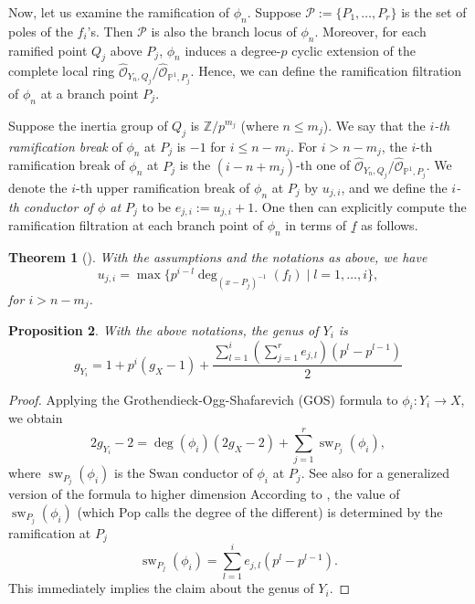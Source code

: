 \documentclass{compositio}
\newcommand{\mat}[1]{\todo[color=green]{MH: #1}}
\newtheorem{theorem}{Theorem}[section]
\newtheorem{proposition}[theorem]{Proposition}
\theoremstyle{remark}
\theoremstyle{remark}
\DeclareMathOperator{\sw}{sw}
\begin{document}
Now, let us examine the ramification of $\phi_n$. Suppose $\mathscr{P}:= \{P_1, \ldots, P_r\}$ is the set of poles of the $f_i$'s. Then $\mathscr{P}$ is also the branch locus of $\phi_n$. Moreover, for each ramified point $Q_j$ above $P_j$, $\phi_n$ induces a degree-$p$ cyclic extension of the complete local ring $\hat{\mathcal{O}}_{Y_n,Q_j}/\hat{\mathcal{O}}_{\mathbb{P}^1,P_j}$. Hence, we can define the ramification filtration of $\phi_n$ at a branch point $P_j$.

Suppose the inertia group of $Q_j$ is $\mathbb{Z}/p^{m_j}$ (where $n\le m_j$). We say that the \textit{$i$-th ramification break} of $\phi_n$ at $P_j$ is $-1$ for $i \le n-m_j$. For $i > n-m_j$, the $i$-th ramification break of $\phi_n$ at $P_j$ is the $(i-n+m_j)$-th one of $\hat{\mathcal{O}}_{Y_n,Q_j}/\hat{\mathcal{O}}_{\mathbb{P}^1,P_j}$. We denote the $i$-th upper ramification break of $\phi_n$ at $P_j$ by $u_{j,i}$, and we define the \textit{$i$-th conductor of $\phi$ at $P_j$} to be $e_{j,i}:=u_{j,i}+1$. One then can explicitly compute the ramification filtration at each branch point of $\phi_n$ in terms of $\underline{f}$ as follows.

\begin{theorem}[{\cite[Theorem 1]{MR1935414}}]
\label{theoremcaljumpirred}
With the assumptions and the notations as above, we have
\begin{equation}
\label{eqnformulalowerjumpasw}
    u_{j,i}=\max\{ p^{i-l} \deg_{(x-P_j)^{-1}} (f_{l}) \mid l=1, \ldots, i\}, 
\end{equation}
for $i>n-m_j$.
\end{theorem}

\begin{proposition}
With the above notations, the genus of $Y_i$ is
    \begin{equation}
    \label{eqngenera}
        g_{Y_i} = 1+ p^i(g_X-1)+ \frac{\sum_{l=1}^i (\sum_{j=1}^r e_{j,l})(p^l-p^{l-1})}{2}
    \end{equation}
\end{proposition}

\begin{proof}
Applying the Grothendieck-Ogg-Shafarevich (GOS) formula \cite[Exp. X formula 7.2]{MR0491704} to $\phi_i: Y_i \xrightarrow{} X$, we obtain
\begin{equation}
\label{eqnGOS}
2g_{Y_i}-2=\deg(\phi_i) (2g_X-2) + \sum_{j=1}^r \sw_{P_j}(\phi_i),
\end{equation}
where $\sw_{P_j}(\phi_i)$ is the Swan conductor of $\phi_i$ at $P_j$. See also \cite[Theorem 4.2.9]{MR2415398} for a generalized version of the formula to higher dimension 
According to \cite[Fact 2.3]{MR3194816}, the value of $\sw_{P_j}(\phi_i)$ (which Pop calls the degree of the different) is determined by the ramification at $P_j$
\begin{equation}
\label{eqndifferent}
\sw_{P_j}(\phi_i)=\sum_{l=1}^i e_{j,l}(p^l-p^{l-1}).
\end{equation}
This immediately implies the claim about the genus of $Y_i$.
\end{proof}
\end{document}
